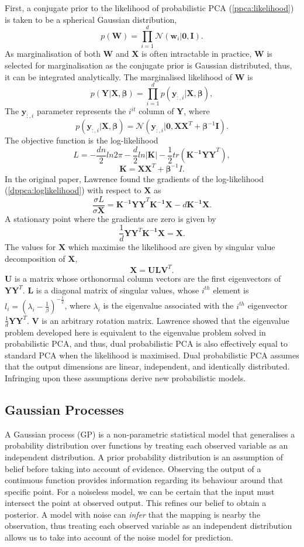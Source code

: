 \documentclass[ %
author={Dillon Keith Diep},
supervisor={Dr. Carl Henrik Ek},
degree={MEng},
title={ART-CG:},
subtitle={Assisted Real-time Content Generation of 3D Hair by Learning Manifolds},
type={Research},
year={2017} ]{dissertation}
\begin{document}
First, a conjugate prior to the likelihood of probabilistic PCA (\ref{ppca:likelihood}) is taken to be a spherical Gaussian distribution,
$$p(\bm{W})=\prod^d_{i=1}\mathcal{N}(\bm{w}_i|\bm{0,I}).$$
As marginalisation of both $\bm{W}$ and $\bm{X}$ is often intractable in practice, $\bm{W}$ is selected for marginalisation as the conjugate prior is Gaussian distributed, thus, it can be integrated analytically.
The marginalised likelihood of $\bm{W}$ is
$$p(\bm{Y|X},\bm{\beta})=\prod^d_{i=1}p(\bm{y}_{:,i}|\bm{X},\bm{\beta}),$$
The $\bm{y}_{:,i}$ parameter represents the $i^{it}$ column of $\bm{Y}$, where
\begin{equation} \label{gplvm:marginal}
p(\bm{y}_{:,i}|\bm{X},\bm{\beta})=\mathcal{N}(\bm{y}_{:,i}|\bm{0,XX}^T+\bm{\beta}^{-1}\bm{I}).
\end{equation}
The objective function is the log-likelihood
\begin{equation} \label{dppca:loglikelihood}
L=-\frac{dn}{2}ln2\pi-\frac{d}{2}ln|\bm{K}|-\frac{1}{2}tr(\bm{K^{-1}YY}^T),
\end{equation}
$$\bm{K=XX}^T+\bm{\beta}^{-1}I.$$
In the original paper, Lawrence found the gradients of the log-likelihood (\ref{dppca:loglikelihood}) with respect to $\bm{X}$ as
$$\frac{\sigma L}{\sigma \bm{X}}=\bm{K^{-1}YY}^T\bm{K^{-1}X}-d\bm{K^{-1}X}.$$ 
A stationary point where the gradients are zero is given by
$$\frac{1}{d}\bm{YY}^T\bm{K^{-1}X=X}.$$
The values for $\bm{X}$ which maximise the likelihood are given by singular value decomposition of $\bm{X}$,
$$\bm{X=ULV}^T.$$
$\bm{U}$ is a matrix whose orthonormal column vectors are the first eigenvectors of $\bm{YY}^T$. $\bm{L}$ is a diagonal matrix of singular values, whose $i^{th}$ element is $l_i=(\lambda_i-\frac{1}{\beta})^{-\frac{1}{2}}$, where $\lambda_i$ is the eigenvalue associated with the $i^{th}$ eigenvector $\frac{1}{d}\bm{YY}^T$. $\bm{V}$ is an arbitrary rotation matrix. Lawrence showed that the eigenvalue problem developed here is equivalent to the eigenvalue problem solved in probabilistic PCA, and thus, dual probabilistic PCA is also effectively equal to standard PCA when the likelihood is maximised.
Dual probabilistic PCA assumes that the output dimensions are linear, independent, and identically distributed. Infringing upon these assumptions derive new probabilistic models.
\subsection{Gaussian Processes}
A Gaussian process (GP) is a non-parametric statistical model that generalises a probability distribution over functions by treating each observed variable as an independent distribution. A prior probability distribution is an assumption of belief before taking into account of evidence. Observing the output of a continuous function provides information regarding its behaviour around that specific point. For a noiseless model, we can be certain that the input must intersect the point at observed output. This refines our belief to obtain a posterior. A model with noise can \textit{infer} that the mapping is nearby the observation, thus treating each observed variable as an independent distribution allows us to take into account of the noise model for prediction.
\end{document}
